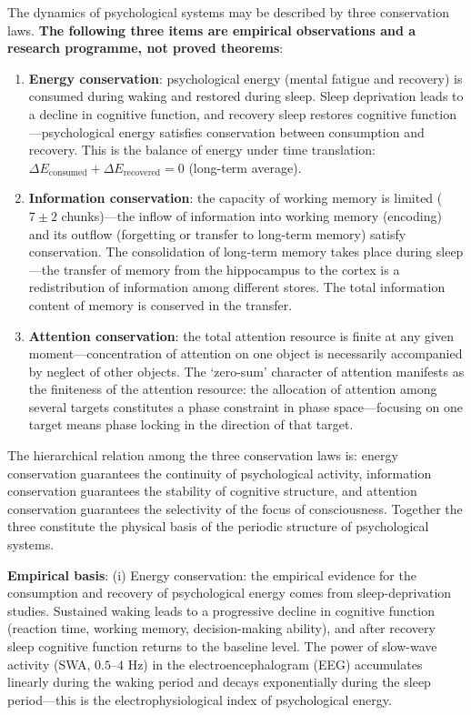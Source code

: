 \begin{remark}\label{thm:psychological_conservation}
The dynamics of psychological systems may be described by three conservation laws. \textbf{The following three items are empirical observations and a research programme, not proved theorems}:
\begin{enumerate}[label=(\roman*)]
    \item \textbf{Energy conservation}: psychological energy (mental fatigue and recovery) is consumed during waking and restored during sleep. Sleep deprivation leads to a decline in cognitive function, and recovery sleep restores cognitive function---psychological energy satisfies conservation between consumption and recovery. This is the balance of energy under time translation: $\Delta E_{\text{consumed}} + \Delta E_{\text{recovered}} = 0$ (long-term average).
    \item \textbf{Information conservation}: the capacity of working memory is limited ($7 \pm 2$ chunks)---the inflow of information into working memory (encoding) and its outflow (forgetting or transfer to long-term memory) satisfy conservation. The consolidation of long-term memory takes place during sleep---the transfer of memory from the hippocampus to the cortex is a redistribution of information among different stores. The total information content of memory is conserved in the transfer.
    \item \textbf{Attention conservation}: the total attention resource is finite at any given moment---concentration of attention on one object is necessarily accompanied by neglect of other objects. The `zero-sum' character of attention manifests as the finiteness of the attention resource: the allocation of attention among several targets constitutes a phase constraint in phase space---focusing on one target means phase locking in the direction of that target.
\end{enumerate}
The hierarchical relation among the three conservation laws is: energy conservation guarantees the continuity of psychological activity, information conservation guarantees the stability of cognitive structure, and attention conservation guarantees the selectivity of the focus of consciousness. Together the three constitute the physical basis of the periodic structure of psychological systems.

\textbf{Empirical basis}:
(i) Energy conservation: the empirical evidence for the consumption and recovery of psychological energy comes from sleep-deprivation studies. Sustained waking leads to a progressive decline in cognitive function (reaction time, working memory, decision-making ability), and after recovery sleep cognitive function returns to the baseline level. The power of slow-wave activity (SWA, $0.5$--$4$ Hz) in the electroencephalogram (EEG) accumulates linearly during the waking period and decays exponentially during the sleep period---this is the electrophysiological index of psychological energy.


\end{remark}
